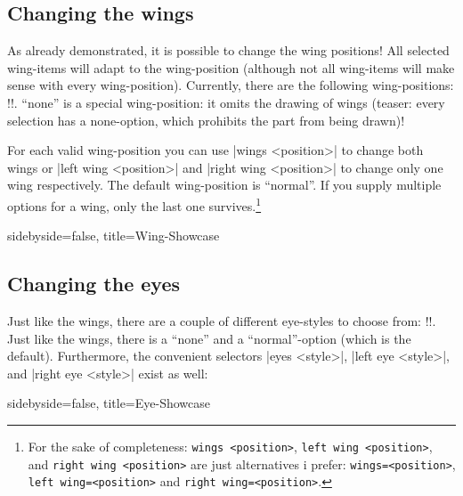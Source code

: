 \documentclass[parskip=half,english,numbers=noenddot,footnotes=nomultiple,oneside]{scrartcl}
\makeatletter
\let\say\enquote
\def\DTLlistformatitem#1{\textit{#1}}
\newcommand*\typesetselection[1][]{\begingroup\ifx!#1!\else\def\DTLlistformatitem##1{#1}\fi\dotypesetselection}
\def\dotypesetselection#1{\expandafter\DTLformatlist\expandafter{\csname @pingu@#1@\endcsname}\endgroup}
\def\ipingu#1{\lstinline'#1'}
\makeatother
\begin{document}
\subsection{Changing the wings}
\label{subsec:wings}As already demonstrated, it is possible to change the wing positions!
All selected wing-items will adapt to the wing-position (although not all wing-items will make sense with every wing-position).
Currently, there are the following wing-positions:
\typesetselection{leftwing}. \say{none} is a special wing-position: it omits the drawing of wings (teaser: every selection has a none-option, which prohibits the part from being drawn)!

For each valid wing-position you can use |wings <position>| to change both wings or |left wing <position>| and |right wing <position>| to change only one wing respectively. The default wing-position is \say{normal}. If you supply multiple options for a wing, only the last one survives.\footnote{For the sake of completeness: \ipingu{wings <position>}, \ipingu{left wing <position>}, and \ipingu{right wing <position>} are just alternatives i prefer: \ipingu{wings=<position>}, \ipingu{left wing=<position>} and \ipingu{right wing=<position>}.}
\begin{tcblisting}{sidebyside=false, title=Wing-Showcase}
\begin{tikzpicture}
	\pingu[left wing none, heart=green]
	\pingu[wings wave, heart=teal, xshift=3.5cm]
	\pingu[wings hug, heart=orange, xshift=7cm]
	\pingu[left wing grab, right wing shock, heart=purple,  xshift=10.5cm]
\end{tikzpicture}
\end{tcblisting}

\subsection{Changing the eyes}
\label{mrk:pengu-eye}Just like the wings, there are a couple of different eye-styles to choose from: \typesetselection{lefteye}. Just like the wings, there is a \say{none} and a \say{normal}-option (which is the default).
Furthermore, the convenient selectors |eyes <style>|, |left eye <style>|, and |right eye <style>| exist as well:
\begin{tcblisting}{sidebyside=false, title=Eye-Showcase}
\begin{tikzpicture}
	\pingu[left eye none, heart=green]
	\pingu[eyes wink, heart=teal, xshift=3.5cm]
	\pingu[eyes shock, heart=orange, xshift=7cm]
	\pingu[left eye devil, right eye angry, heart=purple,  xshift=10.5cm]
\end{tikzpicture}
\end{tcblisting}
\end{document}
